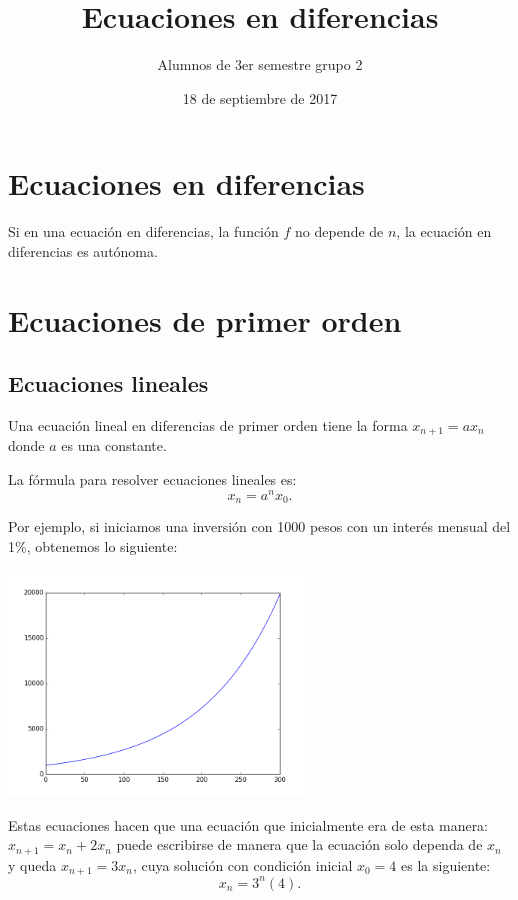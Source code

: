 \documentclass{article}
\title{Ecuaciones en diferencias}
\author{Alumnos de 3er semestre grupo 2}
\date{18 de septiembre de 2017}
\begin{document}
\maketitle

\section{Ecuaciones en diferencias}
\label{sec:ecuaciones}


Si en una ecuación en diferencias, la función $f$ no depende de $n$,
la ecuación en diferencias es autónoma.

\section{Ecuaciones de primer orden}

\subsection{Ecuaciones lineales}

Una ecuación lineal en diferencias de primer orden tiene la forma
$x_{n+1}=ax_n$ donde $a$ es una constante.

La fórmula para resolver ecuaciones lineales es:
\begin{equation}
  \label{lineal}
  x_n=a^nx_0.
\end{equation}

Por ejemplo, si iniciamos una inversión con 1000 pesos con un interés
mensual del 1\%, obtenemos lo siguiente:

\begin{center}
  \includegraphics[width=8cm]{inversion.png}
\end{center}

Estas ecuaciones hacen que una ecuación que inicialmente era de esta
manera: $x_{n+1}=x_n+2x_n$ puede escribirse de manera que la ecuación
solo dependa de $x_n$ y queda $x_{n+1}=3x_n$, cuya solución con
condición inicial $x_0=4$ es la siguiente:
$$x_n=3^n(4).$$
\end{document}
